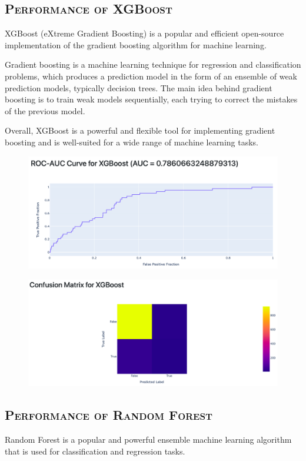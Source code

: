 \documentclass[a4paper,12pt]{article}
\begin{document}
\subsection{\textsc{Performance of XGBoost}}
XGBoost (eXtreme Gradient Boosting) is a popular and efficient open-source implementation of the gradient boosting algorithm for machine learning.

Gradient boosting is a machine learning technique for regression and classification problems, which produces a prediction model in the form of an ensemble of weak prediction models, typically decision trees. The main idea behind gradient boosting is to train weak models sequentially, each trying to correct the mistakes of the previous model.

Overall, XGBoost is a powerful and flexible tool for implementing gradient boosting and is well-suited for a wide range of machine learning tasks.

\begin{figure}[h] 
    \centering
    \includegraphics[width=1\textwidth]{bst_p1} 
\end{figure}

\begin{figure}[h] 
    \centering
    \includegraphics[width=1\textwidth]{bst_p2} 
\end{figure}

\subsection{\textsc{Performance of Random Forest}}
Random Forest is a popular and powerful ensemble machine learning algorithm that is used for classification and regression tasks.
\end{document}
